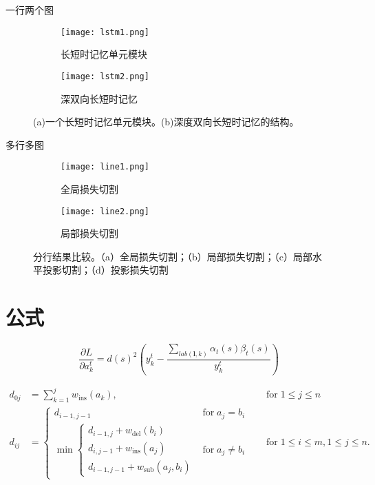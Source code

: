 \documentclass[winfonts]{njuthesis}
\begin{document}
		一行两个图
		\begin{figure}[ht!]
		    \centering
		    \begin{subfigure}{.5\textwidth}
		    	\centering
		        \texttt{[image: lstm1.png]}
		        \caption{长短时记忆单元模块}
		    \end{subfigure}
		    \begin{subfigure}{.4\textwidth}
		    	\centering
		        \texttt{[image: lstm2.png]}
		        \caption{深双向长短时记忆}
		        \label{fig:lstm2}
		    \end{subfigure}
		    \caption{(a)一个长短时记忆单元模块。(b)深度双向长短时记忆的结构。}
		\label{fig:lstm}
		\end{figure}

		多行多图
		\begin{figure}[ht!]
		    \centering
		    \begin{subfigure}{\textwidth}
		        \centering
		        \texttt{[image: line1.png]}
		        \caption{全局损失切割}
		        \label{fig:line1}
		    \end{subfigure}
		    \begin{subfigure}{\textwidth}
		    	\centering
		        \texttt{[image: line2.png]}
		        \caption{局部损失切割}
		        \label{fig:line2}
		    \end{subfigure}
		    \caption{分行结果比较。（a）全局损失切割；（b）局部损失切割；（c）局部水平投影切割；（d）投影损失切割}
		\end{figure}

	\newpage %


	\section{公式}
	
		\begin{equation}
		\frac{\partial L}{\partial a_{k}^t} = {d(s)}^2 (y_{k}^t - \frac{\sum_{lab(\mathbf{l},k)} \alpha_t(s)\beta_t(s) }{y_{k}^t} )
		\end{equation}
		
		\begin{equation}
		\begin{aligned}
		d_{{0j}}&=\sum _{{k=1}}^{{j}}w_{{\mathrm  {ins}}}(a_{{k}}),\quad &{\text{for}}\;1\leq j\leq n\\
		d_{{ij}}&={\begin{cases}d_{{i-1,j-1}}&{\text{for}}\;a_{{j}}=b_{{i}}\\\min {\begin{cases}d_{{i-1,j}}+w_{{\mathrm  {del}}}(b_{{i}})\\d_{{i,j-1}}+w_{{\mathrm  {ins}}}(a_{{j}})\\d_{{i-1,j-1}}+w_{{\mathrm  {sub}}}(a_{{j}},b_{{i}})\end{cases}}&{\text{for}}\;a_{{j}}\neq b_{{i}}\end{cases}}\quad &{\text{for}}\;1\leq i\leq m,1\leq j\leq n.
		\end{aligned}
		\end{equation}
	
\end{document}
